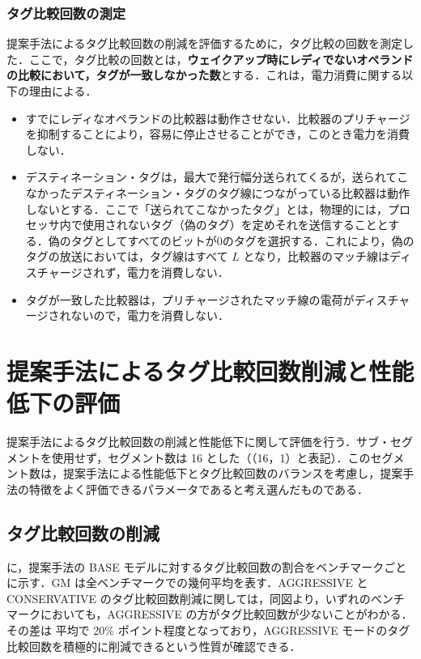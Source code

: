 \subsubsection{タグ比較回数の測定}
提案手法によるタグ比較回数の削減を評価するために，タグ比較の回数を測定した．ここで，タグ比較の回数とは，\textbf{ウェイクアップ時にレディでないオペランドの比較において，タグが一致しなかった数}とする．これは，電力消費に関する以下の理由による．

\begin{itemize}
  \item すでにレディなオペランドの比較器は動作させない．比較器のプリチャージを抑制することにより，容易に停止させることができ，このとき電力を消費しない．
  \item デスティネーション・タグは，最大で発行幅分送られてくるが，送られてこなかったデスティネーション・タグのタグ線につながっている比較器は動作しないとする．ここで「送られてこなかったタグ」とは，物理的には，プロセッサ内で使用されないタグ（偽のタグ）を定めそれを送信することとする．偽のタグとしてすべてのビットが0のタグを選択する．これにより，偽のタグの放送においては，タグ線はすべて $L$ となり，比較器のマッチ線はディスチャージされず，電力を消費しない．
  \item タグが一致した比較器は，プリチャージされたマッチ線の電荷がディスチャージされないので，電力を消費しない．
\end{itemize}

\section{提案手法によるタグ比較回数削減と性能低下の評価}
\label{sec:eval_segIQ}
提案手法によるタグ比較回数の削減と性能低下に関して評価を行う．サブ・セグメントを使用せず，セグメント数は 16 とした（（16，1）と表記）．このセグメント数は，提案手法による性能低下とタグ比較回数のバランスを考慮し，提案手法の特徴をよく評価できるパラメータであると考え選んだものである．

\subsection{タグ比較回数の削減}
に，提案手法の BASE モデルに対するタグ比較回数の割合をベンチマークごとに示す．GM は全ベンチマークでの幾何平均を表す．AGGRESSIVE と CONSERVATIVE のタグ比較回数削減に関しては，同図より，いずれのベンチマークにおいても，AGGRESSIVE の方がタグ比較回数が少ないことがわかる．その差は 平均で 20\% ポイント程度となっており，AGGRESSIVE モードのタグ比較回数を積極的に削減できるという性質が確認できる．

